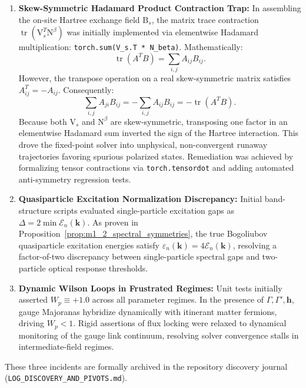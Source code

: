\begin{enumerate}
\item \textbf{Skew-Symmetric Hadamard Product Contraction Trap:}
In assembling the on-site Hartree exchange field $\mathrm{B}_s$, the matrix trace contraction $\operatorname{tr}(\mathrm{V}_s^T \mathrm{N}^\beta)$ was initially implemented via elementwise Hadamard multiplication: \texttt{torch.sum(V\_s.T * N\_beta)}.
Mathematically:
\begin{equation}
\operatorname{tr}(A^T B) = \sum_{i,j} A_{ij} B_{ij}.
\end{equation}
However, the transpose operation on a real skew-symmetric matrix satisfies $A_{ij}^T = -A_{ij}$. Consequently:
\begin{equation}
\sum_{i,j} A_{ji} B_{ij} = -\sum_{i,j} A_{ij} B_{ij} = -\operatorname{tr}(A^T B).
\end{equation}
Because both $\mathrm{V}_s$ and $\mathrm{N}^\beta$ are skew-symmetric, transposing one factor in an elementwise Hadamard sum inverted the sign of the Hartree interaction. This drove the fixed-point solver into unphysical, non-convergent runaway trajectories favoring spurious polarized states. Remediation was achieved by formalizing tensor contractions via \texttt{torch.tensordot} and adding automated anti-symmetry regression tests.

\item \textbf{Quasiparticle Excitation Normalization Discrepancy:}
Initial band-structure scripts evaluated single-particle excitation gaps as $\Delta = 2\min \mathcal{E}_n(\mathbf{k})$. As proven in Proposition~\ref{prop:m1_2_spectral_symmetries}, the true Bogoliubov quasiparticle excitation energies satisfy $\varepsilon_n(\mathbf{k}) = 4\mathcal{E}_n(\mathbf{k})$, resolving a factor-of-two discrepancy between single-particle spectral gaps and two-particle optical response thresholds.

\item \textbf{Dynamic Wilson Loops in Frustrated Regimes:}
Unit tests initially asserted $W_p \equiv +1.0$ across all parameter regimes. In the presence of $\Gamma, \Gamma', \mathbf{h}$, gauge Majoranas hybridize dynamically with itinerant matter fermions, driving $W_p < 1$. Rigid assertions of flux locking were relaxed to dynamical monitoring of the gauge link continuum, resolving solver convergence stalls in intermediate-field regimes.
\end{enumerate}
These three incidents are formally archived in the repository discovery journal (\texttt{LOG\_DISCOVERY\_AND\_PIVOTS.md}).
